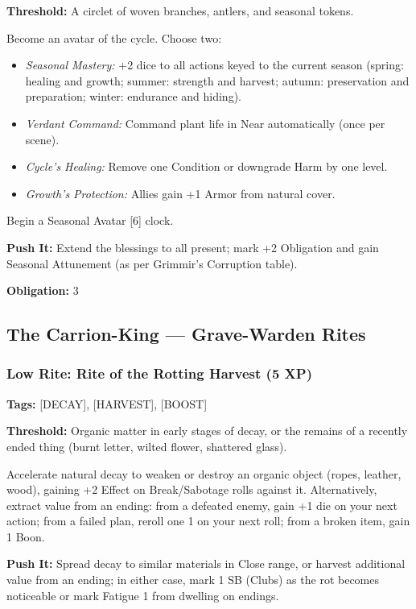 \textbf{Threshold:} A circlet of woven branches, antlers, and seasonal tokens.

Become an avatar of the cycle. Choose two:
\begin{itemize}
\item \textit{Seasonal Mastery:} +2 dice to all actions keyed to the current season (spring: healing and growth; summer: strength and harvest; autumn: preservation and preparation; winter: endurance and hiding).
\item \textit{Verdant Command:} Command plant life in Near automatically (once per scene).
\item \textit{Cycle's Healing:} Remove one Condition or downgrade Harm by one level.
\item \textit{Growth's Protection:} Allies gain +1 Armor from natural cover.
\end{itemize}
Begin a Seasonal Avatar [6] clock.

\textbf{Push It:} Extend the blessings to all present; mark +2 Obligation and gain Seasonal Attunement (as per Grimmir's Corruption table).

\textbf{Obligation:} 3

\subsection{The Carrion-King — Grave-Warden Rites}

\subsubsection{Low Rite: Rite of the Rotting Harvest (5 XP)}

\textbf{Tags:} [DECAY], [HARVEST], [BOOST]

\textbf{Threshold:} Organic matter in early stages of decay, or the remains of a recently ended thing (burnt letter, wilted flower, shattered glass).

Accelerate natural decay to weaken or destroy an organic object (ropes, leather, wood), gaining +2 Effect on Break/Sabotage rolls against it. Alternatively, extract value from an ending: from a defeated enemy, gain +1 die on your next action; from a failed plan, reroll one 1 on your next roll; from a broken item, gain 1 Boon.

\textbf{Push It:} Spread decay to similar materials in Close range, or harvest additional value from an ending; in either case, mark 1 SB (Clubs) as the rot becomes noticeable or mark Fatigue 1 from dwelling on endings.

